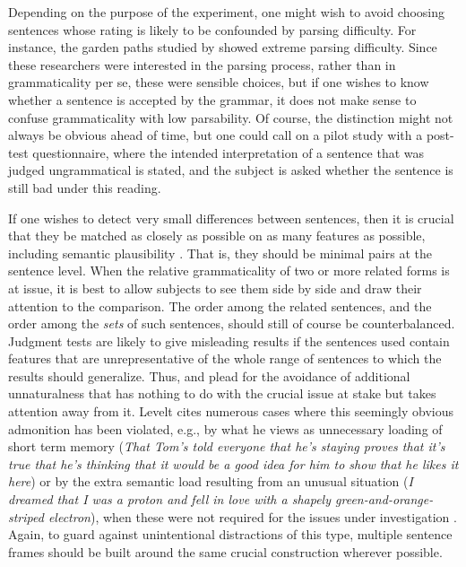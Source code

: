  Depending on the purpose of the experiment, one might wish to avoid choosing sentences whose rating is likely to be confounded by parsing difficulty. For instance, the garden paths studied by \citet{WarnerEtAl1987} showed extreme parsing difficulty. Since these researchers were interested in the parsing process, rather than in grammaticality per se, these were sensible choices, but if one wishes to know whether a sentence is accepted by the grammar, it does not make sense to confuse grammaticality with low parsability. Of course, the distinction might not always be obvious ahead of time, but one could call on a pilot
 study with a post-test questionnaire, where the intended interpretation of a sentence that was judged ungrammatical is stated, and the subject is asked whether the sentence is still bad under this reading.

 If one wishes to detect very small differences between sentences, then it is crucial that they be matched as closely as possible on as many features as possible, including semantic plausibility \citep{CardenEtAl1981}. That is, they should be minimal pairs at the sentence level. When the relative grammaticality of two or more related forms is at issue, it is best to allow subjects to see them side by side and draw their attention to the comparison. The order among the related sentences, and the order among the \textit{sets} of such sentences, should still of course be counterbalanced. Judgment tests are likely to give misleading results if the sentences used contain features that are unrepresentative of the whole range of sentences to which the results should generalize. Thus, \citet[vol. 3]{Levelt1974} and \citet{Bolinger1971} plead for the avoidance of additional unnaturalness that has nothing to do with the crucial issue at stake but takes attention away from it. Levelt cites numerous cases where this seemingly obvious admonition has been violated, e.g., by what he views as unnecessary loading of short term memory (\textit{That Tom's told everyone that he's staying proves that it's true that he's thinking that it would be a good idea for him to show that he likes it here}) or by the extra semantic load resulting from an unusual situation (\textit{I dreamed that I was a proton and fell in love with a shapely green-and-orange-striped electron}), when these were not required for the issues under investigation \citep{Levelt1972}. Again, to guard against unintentional distractions of this type, multiple sentence frames should be built around the same crucial construction wherever possible.

